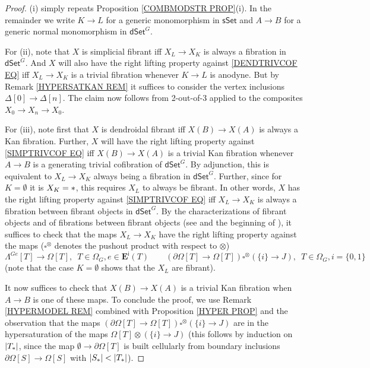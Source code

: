 \documentclass[a4paper,10pt
 ,draft
]{article}%
\begin{document}
\begin{proof}
(i) simply repeats Proposition \ref{COMBMODSTR PROP}(i). In the remainder we write $K \to L$ for a generic monomorphism in 
$\mathsf{sSet}$
and $A \to B$ for a generic normal monomorphism in $\mathsf{dSet}^G$.


For (ii), note that $X$ is simplicial fibrant iff 
$X_L \to X_K$ is always a fibration in $\mathsf{dSet}^G$. 
And $X$ will also have the right lifting property against \eqref{DENDTRIVCOF EQ} iff 
$X_L \to X_K$ is a trivial fibration whenever $K \to L$ is anodyne. But by Remark \ref{HYPERSATKAN REM}
it suffices to consider the vertex inclusions $\Delta[0] \to \Delta[n]$.
The claim now follows from 2-out-of-3 applied to the composites $X_0 \to X_n \to X_0$.


For (iii), note first that $X$ is dendroidal fibrant iff $X(B) \to X(A)$ is always a Kan fibration.
Further, $X$ will have the right lifting property against \eqref{SIMPTRIVCOF EQ} iff 
$X(B) \to X(A)$ is a trivial Kan fibration whenever $A\to B$ is a generating trivial cofibration of $\mathsf{dSet}^G$.
By adjunction, this is equivalent to 
$X_L \to X_K$ always being a fibration in $\mathsf{dSet}^G$.
Further, since for $K=\emptyset$ it is $X_{K}=\**$, this requires $X_L$ to always be fibrant. In other words, $X$ has the right lifting property against \eqref{SIMPTRIVCOF EQ} iff
$X_L \to X_K$ is always a fibration between fibrant objects in $\mathsf{dSet}^G$.
By the characterizations of fibrant objects and of fibrations between fibrant objects (see \cite[Prop. 8.8]{Per18} and the beginning of \cite[\S 8.1]{Per18}), it suffices to check that the maps $X_L \to X_K$ have the right lifting property against the maps 
($\square^{\otimes}$ denotes the pushout product with respect to
$\otimes$)
\begin{equation}\label{FIBBFIB EQ}
	\Lambda^{G e} [T] \to \Omega[T],
	\phantom{1}
	T \in \Omega_G, e \in \boldsymbol{E}^{\mathsf{i}}(T)
\qquad
	\left( \partial\Omega[T] \to \Omega[T]\right) \square^{\otimes} \left( \{i\} \to J\right),
	\phantom{1}
	T \in \Omega_G, i = \{0,1\}
\end{equation}
(note that the case $K=\emptyset$ shows that the $X_L$ are fibrant).

It now suffices to check that $X(B) \to X(A)$ is a trivial Kan fibration when $A\to B$ is one of these maps.
To conclude the proof, we use Remark \ref{HYPERMODEL REM}
combined with Proposition \ref{HYPER PROP}
and the observation that the maps 
$\left( \partial\Omega[T] \to \Omega[T]\right) \square^{\otimes} \left( \{i\} \to J\right)$
are in the hypersaturation of the maps
$ \Omega[T] \otimes \left( \{i\} \to J\right)$
(this follows by induction on $|T_{\**}|$, since the map
$\emptyset \to \partial \Omega[T]$ is built cellularly from boundary inclusions
$\partial \Omega[S] \to \Omega[S]$ with $|S_{\**}|<|T_{\**}|$).
\end{proof}
\end{document}
